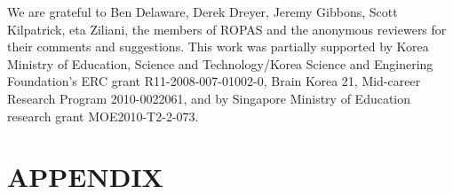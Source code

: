 \documentclass[acmlarge, anonymous, review, authorname]{acmart}
\begin{document}








%






\begin{acks}
We are grateful to Ben Delaware, Derek Dreyer, Jeremy Gibbons, Scott
Kilpatrick, eta Ziliani, the members of ROPAS and the
anonymous reviewers for their comments and suggestions.  This work was
partially supported by Korea Ministry of Education, Science and
Technology/Korea Science and Enginering Foundation's ERC grant
R11-2008-007-01002-0, Brain Korea 21, Mid-career Research Program 2010-0022061, and
by Singapore Ministry of Education research grant MOE2010-T2-2-073.
\end{acks}




\appendix
\section*{APPENDIX}
\setcounter{section}{1}





\end{document}
